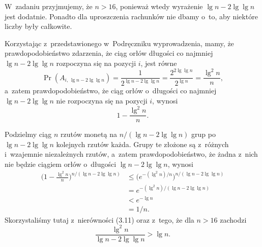 \exercise %
W~zadaniu przyjmujemy, że $n>16$, ponieważ wtedy wyrażenie $\lg n-2\lg\lg n$ jest dodatnie.
Ponadto dla uproszczenia rachunków nie dbamy o~to, aby niektóre liczby były całkowite.

Korzystając z~przedstawionego w~Podręczniku wyprowadzenia, mamy, że prawdopodobieństwo zdarzenia, że ciąg orłów długości co najmniej $\lg n-2\lg\lg n$ rozpoczyna się na pozycji $i$, jest równe
\[
	\Pr(A_{i,\,\lg n-2\lg\lg n}) = \frac{1}{2^{\lg n-2\lg\lg n}} = \frac{2^{2\lg\lg n}}{2^{\lg n}} = \frac{\lg^2n}{n},
\]
a~zatem prawdopodobieństwo, że ciąg orłów o~długości co najmniej $\lg n-2\lg\lg n$ nie rozpoczyna się na pozycji $i$, wynosi
\[
	1-\frac{\lg^2n}{n}.
\]

Podzielmy ciąg $n$ rzutów monetą na $n/(\lg n-2\lg\lg n)$ grup po $\lg n-2\lg\lg n$ kolejnych rzutów każda.
Grupy te złożone są z~różnych i~wzajemnie niezależnych rzutów, a~zatem prawdopodobieństwo, że żadna z~nich nie będzie ciągiem orłów o~długości $\lg n-2\lg\lg n$, wynosi
\begin{align*}
	\biggl(1-\frac{\lg^2n}{n}\biggr)^{n/(\lg n-2\lg\lg n)} &\le \bigl(e^{-(\lg^2n)/n}\bigr)^{n/(\lg n-2\lg\lg n)} \\
	&= e^{-(\lg^2n)/(\lg n-2\lg\lg n)} \\
	&< e^{-\lg n} \\
	&= 1/n.
\end{align*}
Skorzystaliśmy tutaj z~nierówności (3.11) oraz z~tego, że dla $n>16$ zachodzi
\[
	\frac{\lg^2n}{\lg n-2\lg\lg n} > \lg n.
\]
